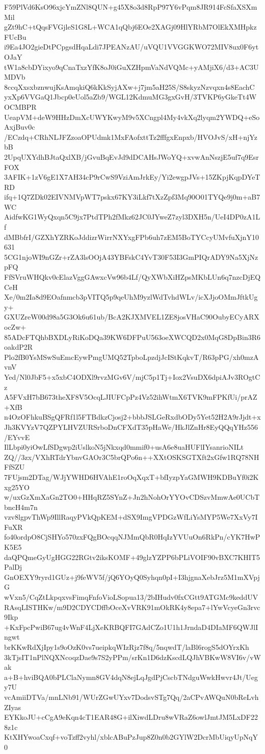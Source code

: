 F59PlVd6KsO96xjcYmZNl8QUN+g45X8o3d8RpP97Y6vPqm8JR914FcSfaXSXmMil
gZt9hC+tQqsFVGjleS1G8L+WCA1qQbj6EOe2XAGj09HlYRbM7OlEkXMHpkzFUcBu
i9Ea4JO2gieDtPCpgsdHqaLdi7JPEANzAU/uVQU1VVGGKWO72MIV8ux0F6ytOJaY
tW1a8cbDYixyo9qCnaTxzYfK8oJ0iGuXZHpmVaNdVQMc+yAMjiX6/d3+AC3UMDVb
8ccqXxsxbznwujKsAmqkiQ6kKkSyjAXw+j7jm5aH25S/S8skyzNzvqxn4s8EachC
yxXp6VVGaQ1Jbcp0eUol5aZb9/WGL12KdmuMG3gxGvH/3TVKP6yGkeTt4WOCMBPR
UeapVM+deW9HHzDmXcUWYKwyM9v5XCngpl4My4vkXq2lyqm2YWDQ+eSoAxjBuv0c
/ECzdq+CRhNLJFZzoaOPUdmk1MxFAofxttTz2fffgxEnpxb/HVOJvS/xH+njYzbB
2UpqUXYdhBJtaQxlXB/jGvuBqEvJd9dDCAHsJWoYQ+xvwAnNszjE5uf7q9EsrFOX
3AFIK+1zV6gE1X7AH34cP9rCwS9VziAmJrkEy/Yi2ewgpJVs+15ZKpjKqpDYeTRD
ifq+1Q7ZDk02EIVNMVpWT7pskx67KY3iLkf7tXzZpf3Mq90O01TYQe9j0m+aB7WC
AidfwKG1WyQxqn5C9jx7PtdTPh2fMkz62JC0JYweZ7zyl3DXH5n/UeI4DP0zA1Lf
dMBbfrI/GZXhYZRKoJddizrWirrNXYxgFPb6uh7zEM5BoTYCcyUMvfuXjnY10631
5CG1njoWI9nGZr+rZA3lsOOjA43YBFskC4YvT30F53I3GmPIQrADY9Na5XjNzpFQ
FfSVruWHQkv0cElazVggGAwxcVw96b4Lf/QyXWbXiHZpsMKbLUn6q7nzcDjEQCeH
Xe/0m2Ia8d9EOafnmcb3pVITQ5p9qeUhM9yzlWdTvhdWLv/icXJjoOMmJftkUgy+
GXUZreW00d98a5G3Ok6u61ub/BcA2KJXMVEL1ZE8josVHaC90OubyECyARXocZw+
85ADcFTQhbBXDLyRiKoDQa39KW6DFPuU563oeXWCQD2x0MqG8DpBin3R6oakdP2R
Plo2fB0YsMSwSuEmcEywPmgUMQ52TpboLpzdjJcIStKqkvT/R63pPG/xh0mzAvnV
Yed/Nl0JbF5+x5xbC4ODXl9rvzMGv6V/mjC5p1Tj+Iox2VsuDX6dpiAJv3ROgtCz
A5FVxH7bB673theXF8V5OcqLJIUFCpPz4Vz52ihWtmX6TVK9mFPKfUi/prAZ+XfB
n4OzOFhkuBSgQFRf1l5FTBdkzCjosj2+bbbJSLGeRxdbODy5Yet52H2A9rJjdt+x
Jh3KVYzV7QZPYLHVZURSrboDnCFXdT35pHaWe/HkJlZnHr8EyQQqYHz556/EYvvE
IlLbpi0yiOwLfSDgwp2iUslkoN5jNkxqd0mmif0+usA6e8uaHUFlIYsanrioNILt
ZQ//3zx/VXhRTdrYbnvGAOr3C5brQPo6n++XXtOSKSGTXft2xGfw1RQ78NHFfSZU
7FUjsm2DTag/WJjYWHD6HVAhE1roOqXqxT+bfIyzpYaGMWH9KDBuYf0i2Kxg25YO
w/uxGzXmXaGn2TO0+HHqRZ5SYnZ+Jn2hNohOrYYOvCDSzvMmwAe0UCbTbncH4m7n
vzv8lgpvThWp9IllRaqyPVkQpKEM+dSX9ImgVPDGzWfLiYsMYP5We7XxVy7IFuXR
fo40ordpO8CjSHYo570zxFQgBOcqqNJMmQbR0HqIzYVUuOn6RkPn/cYK7HwPK5E5
daQPQmeGyUgHGG22RGtv2iksKOMF+49glzYZPP6bPLiVOIF90vBXC7KHIT5PalDj
GnOEXY9ryrd1GUz+j9feWV5f/jQ6YOyQ0Syhqn0pI+I3hjgnaXebJrz5M1mXVpjG
wVxn5/CqZtLkpqxvsFimqFnfoVioLSopua13/2bIHudv0fxCGtt9ATGMc9keddUV
RAsqLISTHKw/m9D2CDYCDffbOceXvVRK91mOkRK4y8epa7+lYwVcyeGn3rvc9Ikp
+KxFpcPwiB67ug4vWnF4LjXeKRBQFI7GAdCZo1U1h1JrndaD4DIaMF6QWJlIngwt
brKKwRdXjIpy1s9oOzK0vs7ueipkqWIzRjz7f8q/5nqwdT/laBl6rogS5dOYrxKh
3kTjsIT1nPlNQXNcoqzDae9s7S2yPPm/srKn1D6dzKscdLQJhVBKwW8VI6v/vWak
a+B+hviBQA0bPLClaNymn8GV4dqN8ejLqJgdPjCscbTNdguWwkHwvr4Jt/Uegy7U
vcAmiiDTVa/mnLNb91/WUrZGwUYxv7DodsvSTg7Qq/2aCPvAWQuN0bReLvhZIyas
EYKkoJU+cCgA9eKqn4cT1EAR48G+ilXiwdLDru8wVRaZ6owlJmtJM5LxDF228z1c
KtXHYwoaCxqf+voTzff2vyhl/xblcABuPzJup8Z0n0b2GYlW2DcrMbUiqyUpNqY0

